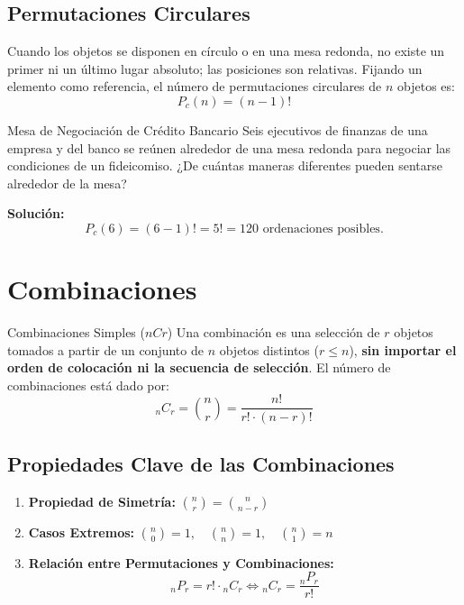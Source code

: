 \subsection{Permutaciones Circulares}
Cuando los objetos se disponen en círculo o en una mesa redonda, no existe un primer ni un último lugar absoluto; las posiciones son relativas. Fijando un elemento como referencia, el número de permutaciones circulares de $n$ objetos es:
\begin{equation}
    P_c(n) = (n-1)!
\end{equation}

\begin{ejemplo}{Mesa de Negociación de Crédito Bancario}
Seis ejecutivos de finanzas de una empresa y del banco se reúnen alrededor de una mesa redonda para negociar las condiciones de un fideicomiso. ¿De cuántas maneras diferentes pueden sentarse alrededor de la mesa?

\tcbline
\textbf{Solución:}
\[
P_c(6) = (6-1)! = 5! = 120 \text{ ordenaciones posibles.}
\]
\end{ejemplo}

\section{Combinaciones}
\begin{definicion}{Combinaciones Simples ($nCr$)}
Una combinación es una selección de $r$ objetos tomados a partir de un conjunto de $n$ objetos distintos ($r \le n$), \textbf{sin importar el orden de colocación ni la secuencia de selección}. El número de combinaciones está dado por:
\begin{equation}
    {}_n C_r = \binom{n}{r} = \frac{n!}{r! \cdot (n-r)!}
\end{equation}
\end{definicion}

\subsection{Propiedades Clave de las Combinaciones}
\begin{enumerate}
    \item \textbf{Propiedad de Simetría:} $\binom{n}{r} = \binom{n}{n-r}$
    \item \textbf{Casos Extremos:} $\binom{n}{0} = 1, \quad \binom{n}{n} = 1, \quad \binom{n}{1} = n$
    \item \textbf{Relación entre Permutaciones y Combinaciones:}
    \begin{equation}
        {}_n P_r = r! \cdot {}_n C_r \iff {}_n C_r = \frac{{}_n P_r}{r!}
    \end{equation}
\end{enumerate}

